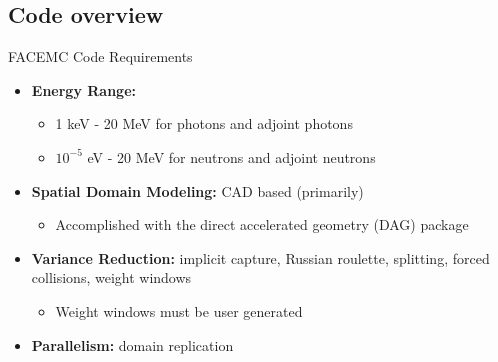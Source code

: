 \documentclass{beamer}
\begin{document}
\subsection{Code overview}
\begin{frame}{FACEMC Code Requirements}


  \begin{itemize}
    \item \textbf{Energy Range:}
      \begin{itemize}
        \item 1 keV - 20 MeV for photons and adjoint photons
        \item $10^{-5}$ eV - 20 MeV for neutrons and adjoint neutrons
          \bigskip
      \end{itemize}
    \item \textbf{Spatial Domain Modeling:} CAD based (primarily)
      \begin{itemize}
        \item Accomplished with the direct accelerated geometry (DAG) package
      \end{itemize}
      \bigskip
    \item \textbf{Variance Reduction:} implicit capture, Russian roulette,
      splitting, forced collisions, weight windows
      \begin{itemize}
        \item Weight windows must be user generated
      \end{itemize}
      \bigskip
    \item \textbf{Parallelism:} domain replication
  \end{itemize}

\end{frame}

  

\end{document}
